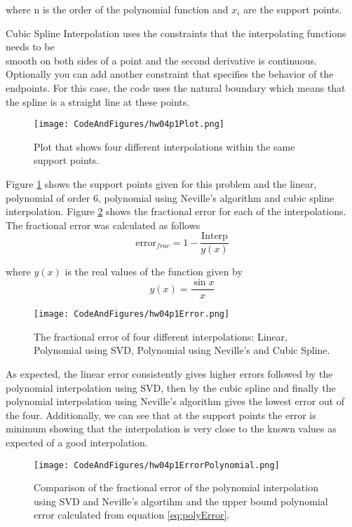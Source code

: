where n is the order of the polynomial function and $x_i$ are the support points. 

Cubic Spline Interpolation uses the constraints that the interpolating functions needs to be \\
smooth on both sides of a point and the second derivative is continuous. Optionally you can add another constraint that specifies the behavior of the endpoints. For this case, the code uses the natural boundary which means that the spline is a straight line at these points.
\begin{figure}
    \centering
    \texttt{[image: CodeAndFigures/hw04p1Plot.png]}
    \caption{Plot that shows four different interpolations within the same support points.}
    \label{fig:p1interp}
\end{figure}

Figure \ref{fig:p1interp} shows the support points given for this problem and the linear, polynomial of order 6, polynomial using Neville's algorithm and cubic spline interpolation. Figure \ref{fig:p1interpError} shows the fractional error for each of the interpolations. The fractional error was calculated as follows
\begin{equation}
    \mathrm{error}_{frac}=1-\frac{\mathrm{Interp}}{y(x)}
\end{equation}

 where $y(x)$ is the real values of the function given by
\begin{equation}
    y(x) = \frac{\sin{x}}{x}
\end{equation}

\begin{figure}
    \centering
    \texttt{[image: CodeAndFigures/hw04p1Error.png]}
    \caption{The fractional error of four different interpolations: Linear, Polynomial using SVD, Polynomial using Neville's and Cubic Spline.}
    \label{fig:p1interpError}
\end{figure}

As expected, the linear error consistently gives higher errors followed by the polynomial interpolation using SVD, then by the cubic spline and finally the polynomial interpolation using Neville's algorithm gives the lowest error out of the four. Additionally, we can see that at the support points the error is minimum showing that the interpolation is very close to the known values as expected of a good interpolation.

\begin{figure}
    \centering
    \texttt{[image: CodeAndFigures/hw04p1ErrorPolynomial.png]}
    \caption{Comparison of the fractional error of the polynomial interpolation using SVD and Neville's algortihm and the upper bound polynomial error calculated from equation \ref{eq:polyError}.}
    \label{fig:p1PolyError}
\end{figure}

